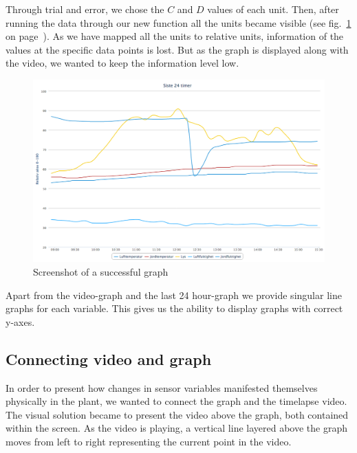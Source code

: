 

Through trial and error, we chose the \ensuremath{C} and \ensuremath{D} values of each unit. Then, after running the data through our new function all the units became visible (see fig.~\ref{fig:goodgraph} on page~\pageref{fig:goodgraph}). As we have mapped all the units to relative units, information of the values at the specific data points is lost. But as the graph is displayed along with the video, we wanted to keep the information level low.  

\begin{figure}
\centering
\includegraphics[width=1\textwidth]{img/interface/goodgraph.png}
\caption{Screenshot of a successful graph}
\label{fig:goodgraph}
\end{figure}


Apart from the video-graph and the last 24 hour-graph we provide singular line graphs for each variable. This gives us the ability to display graphs with correct y-axes. 

\subsection{Connecting video and graph}
In order to present how changes in sensor variables manifested themselves physically in the plant, we wanted to connect the graph and the timelapse video. The visual solution became to present the video above the graph, both contained within the screen. As the video is playing, a vertical line layered above the graph moves from left to right representing the current point in the video. 

